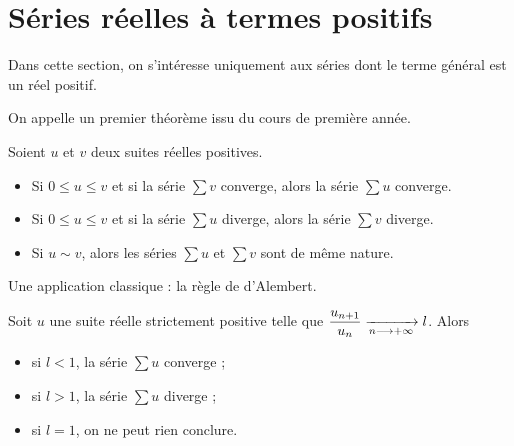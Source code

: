 \section{Séries réelles à termes positifs}

Dans cette section, on s'intéresse uniquement aux séries dont le terme général est un réel positif.

On appelle un premier théorème issu du cours de première année.

\begin{theo}
Soient \(u\) et \(v\) deux suites réelles positives.

\begin{itemize}
    \item Si \(0\leq u\leq v\) et si la série \(\sum v\) converge, alors la série \(\sum u\) converge. \\
    \item Si \(0\leq u\leq v\) et si la série \(\sum u\) diverge, alors la série \(\sum v\) diverge. \\
    \item Si \(u\sim v\), alors les séries \(\sum u\) et \(\sum v\) sont de même nature.
\end{itemize}
\end{theo}

Une application classique : la règle de d'Alembert.

\begin{prop}
Soit \(u\) une suite réelle strictement positive telle que \(\dfrac{u_{n+1}}{u_n}\xrightarrow[n\longrightarrow+\infty]{}l\). Alors

\begin{itemize}
    \item si \(l<1\), la série \(\sum u\) converge ; \\
    \item si \(l>1\), la série \(\sum u\) diverge ; \\
    \item si \(l=1\), on ne peut rien conclure.
\end{itemize}
\end{prop}

